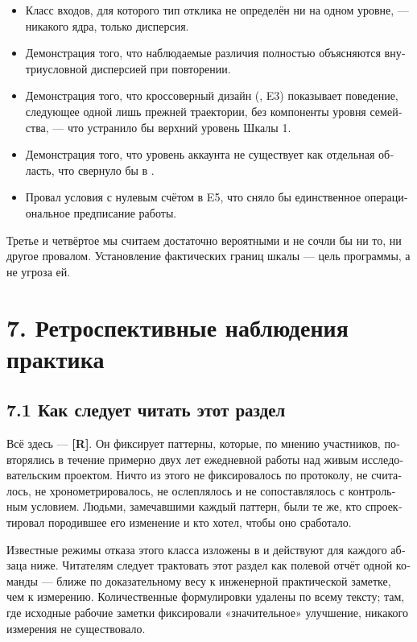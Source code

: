 \begin{russian}
\begin{itemize}
  \item Класс входов, для которого тип отклика не определён ни на одном уровне, — никакого ядра, только дисперсия.
  \item Демонстрация того, что наблюдаемые различия полностью объясняются внутриусловной дисперсией при повторении.
  \item Демонстрация того, что кроссоверный дизайн (, E3) показывает поведение, следующее одной лишь прежней траектории, без компоненты уровня семейства, — что устранило бы верхний уровень Шкалы 1.
  \item Демонстрация того, что уровень аккаунта не существует как отдельная область, что свернуло бы  в .
  \item Провал условия с нулевым счётом в E5, что сняло бы единственное операциональное предписание работы.
\end{itemize}
Третье и четвёртое мы считаем достаточно вероятными и не сочли бы ни то, ни другое провалом. Установление фактических границ шкалы — цель программы, а не угроза ей.


\section*{7. Ретроспективные наблюдения практика}
\label{sec:ru:7}


\subsection*{7.1 Как следует читать этот раздел}
\label{sec:ru:7.1}

Всё здесь — \textbf{[R]}. Он фиксирует паттерны, которые, по мнению участников, повторялись в течение примерно двух лет ежедневной работы над живым исследовательским проектом. Ничто из этого не фиксировалось по протоколу, не считалось, не хронометрировалось, не ослеплялось и не сопоставлялось с контрольным условием. Людьми, замечавшими каждый паттерн, были те же, кто спроектировал породившее его изменение и кто хотел, чтобы оно сработало.

Известные режимы отказа этого класса изложены в  и действуют для каждого абзаца ниже. Читателям следует трактовать этот раздел как полевой отчёт одной команды — ближе по доказательному весу к инженерной практической заметке, чем к измерению. Количественные формулировки удалены по всему тексту; там, где исходные рабочие заметки фиксировали «значительное» улучшение, никакого измерения не существовало.


\end{russian}
